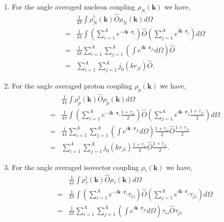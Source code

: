 \documentclass[12pt,letterpaper,UTF8]{report}
\begin{document}
{\begin{enumerate}
  \item For the angle averaged nucleon coupling $\rho_N (\bm{k})$ we have,
\begin{eqnarray}
&&
\frac{1}{4\pi} \int \rho_N^\dagger(\bm{k}) \hat{O} \rho_N(\bm{k})  d \Omega \nonumber \\
&=&
\frac{1}{4\pi}  \int  \left(\sum_{i=1}^{A} e^{-i \bm{k} \cdot \bm{r}_i }\right)
\hat{O}
\left(\sum_{j=1}^{A} e^{i \bm{k} \cdot \bm{r}_j } \right)  d \Omega  \nonumber  \\
&=& \frac{1}{4\pi}
\sum_{i=1}^{A} \sum_{j=1}^{A} \left( \int   e^{i \bm{k} \cdot \bm{r}_{ji} }
 d \Omega \right) \hat{O} \nonumber \\
&=& \sum_{i=1}^{A} \sum_{j=1}^{A} j_0(k{r}_{ji}) \hat{O} .
\end{eqnarray}
  \item For the angle averaged proton coupling $\rho_p (\bm{k})$ we have,
\begin{eqnarray}
&&
\frac{1}{4\pi} \int \rho_p^\dagger(\bm{k}) \hat{O} \rho_p(\bm{k})  d \Omega \nonumber \\
 &=& \frac{1}{4\pi}
 \int  \left(\sum_{i=1}^{A} e^{-i \bm{k} \cdot \bm{r}_i } \frac{1+\tau_{iz}}{2} \right)
\hat{O}
\left(\sum_{j=1}^{A} e^{i \bm{k} \cdot \bm{r}_j } \frac{1+\tau_{jz}}{2}  \right)  d \Omega  \nonumber  \\
&=& \frac{1}{4\pi}
 \sum_{i=1}^{A} \sum_{j=1}^{A} \left( \int e^{i \bm{k} \cdot \bm{r}_{ji} }  d \Omega \right)
\frac{1+\tau_{iz}}{2} \hat{O} \frac{1+\tau_{jz}}{2} \nonumber \\
&=&
 \sum_{i=1}^{A} \sum_{j=1}^{A} j_0(k{r}_{ji})
\frac{1+\tau_{iz}}{2} \hat{O} \frac{1+\tau_{jz}}{2} .
\end{eqnarray}
  \item For the angle averaged isovector coupling $\rho_\tau (\bm{k})$ we have,
\begin{eqnarray}
&&
\frac{1}{4\pi} \int \rho_\tau^\dagger(\bm{k}) \hat{O} \rho_\tau(\bm{k})  d \Omega \nonumber \\
&=& \frac{1}{4\pi}
 \int  \left(\sum_{i=1}^{A} e^{-i \bm{k} \cdot \bm{r}_i } \tau_{iz} \right)
\hat{O}
\left(\sum_{j=1}^{A} e^{i \bm{k} \cdot \bm{r}_j } \tau_{jz} \right)  d \Omega \nonumber  \\
&=& \frac{1}{4\pi}
 \sum_{i=1}^{A} \sum_{j=1}^{A} \left( \int e^{i \bm{k} \cdot \bm{r}_{ji} }  d \Omega \right)
\tau_{iz} \hat{O}\tau_{jz} \nonumber \\

\end{eqnarray}
\end{enumerate}}
\end{document}
